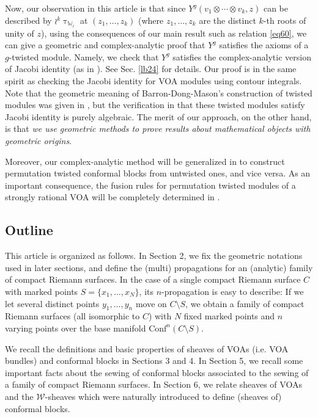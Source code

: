 \documentclass[12pt,a4paper,notitlepage]{article}
\theoremstyle{definition}
\theoremstyle{plain}
\newcommand{\Conf}{\mathrm{Conf}}
\newcommand{\scr}{\mathscr}
\newcommand{\Wbb}{\mathbb W}
\numberwithin{equation}{section}
\begin{document}
Now, our observation in this article is that since $Y^g(v_1\otimes\cdots\otimes v_k,z)$ can be described by $\wr^k\uptau_{\Wbb_i}$ at $(z_1,\dots,z_k)$ (where $z_1,\dots,z_k$ are the distinct $k$-th roots of unity of $z$), using the consequences of our main result such as relation \eqref{eq60}, we can give a geometric and complex-analytic proof that $Y^g$ satisfies the axioms of a $g$-twisted module. Namely, we check that $Y^g$ satisfies the complex-analytic version of Jacobi identity (as in \cite{Hua10}). See Sec. \ref{lb24} for details. Our proof is in the same spirit as checking the Jacobi identity for VOA modules using contour integrals. Note that the geometric meaning of Barron-Dong-Mason's construction of twisted modules was given in \cite{BDM02,BHL07}, but the verification in \cite{BDM02} that these twisted modules satisfy Jacobi identity is purely algebraic. The merit of our approach, on the other hand, is that \emph{we use geometric methods to prove results about mathematical objects with geometric origins}.

Moreover,   our complex-analytic method will be generalized in \cite{Gui21} to construct permutation twisted conformal blocks from untwisted ones, and vice versa. As an important consequence, the fusion rules for permutation twisted modules of a strongly rational VOA will be completely determined in \cite{Gui21}.




\subsection*{Outline}


This article is organized as follows. In Section 2, we fix the geometric notations used in later sections, and define the (multi) propagations for an (analytic) family of compact Riemann surfaces. In the case of a single compact Riemann surface $C$ with marked points $S=\{x_1,\dots,x_N\}$, its $n$-propagation is easy to describe: If we let several distinct points $y_1,\dots,y_n$ move on $C\setminus S$, we obtain a family of compact Riemann surfaces (all isomorphic to $C$) with $N$ fixed marked points and $n$ varying points over the base manifold $\Conf^n(C\setminus S)$.

We recall the definitions and basic properties of sheaves of VOAs (i.e. VOA bundles) and conformal blocks in Sections 3 and 4. In Section 5, we recall some important facts about the sewing of conformal blocks associated to the sewing of a family of compact Riemann surfaces. In Section 6, we relate sheaves of VOAs and the $\scr W$-sheaves which were naturally introduced to define (sheaves of) conformal blocks.
\end{document}
